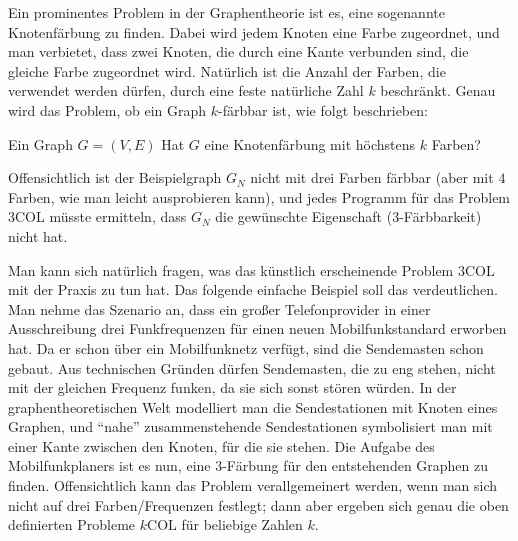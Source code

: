 Ein prominentes Problem in der Graphentheorie ist es, eine sogenannte
Knotenfärbung zu finden. Dabei wird jedem Knoten eine Farbe
zugeordnet, und man verbietet, dass zwei Knoten, die durch eine Kante
verbunden sind, die gleiche Farbe zugeordnet wird. Natürlich ist die
Anzahl der Farben, die verwendet werden dürfen, durch eine feste
natürliche Zahl $k$ beschränkt. Genau wird das Problem, ob ein Graph
$k$-färbbar ist, wie folgt beschrieben:

{Ein Graph $G=(V,E)$}
{Hat $G$ eine Knotenfärbung mit höchstens $k$ Farben?}

Offensichtlich ist der Beispielgraph $G_N$ nicht mit drei Farben färbbar
(aber mit $4$ Farben, wie man leicht ausprobieren kann), und jedes
Programm für das Problem $3\mathrm{COL}$ müsste ermitteln, dass $G_N$ die
gewünschte Eigenschaft ($3$-Färbbarkeit) nicht hat.

Man kann sich natürlich fragen, was das künstlich erscheinende
Problem $3\mathrm{COL}$ mit der Praxis zu tun hat. Das folgende einfache
Beispiel soll das verdeutlichen. Man nehme das Szenario an, dass
ein großer Telefonprovider in einer Ausschreibung drei
Funkfrequenzen für einen neuen Mobilfunkstandard erworben hat. Da er
schon über ein Mobilfunknetz verfügt, sind die Sendemasten schon
gebaut. Aus technischen Gründen dürfen Sendemasten, die zu eng stehen,
nicht mit der gleichen Frequenz funken, da sie sich sonst stören
würden. In der graphentheoretischen Welt modelliert man die
Sendestationen mit Knoten eines Graphen, und "`nahe"' zusammenstehende
Sendestationen symbolisiert man mit einer Kante zwischen den Knoten,
für die sie stehen. Die Aufgabe des Mobilfunkplaners ist es nun, eine
$3$-Färbung für den entstehenden Graphen zu finden. Offensichtlich
kann das Problem verallgemeinert werden, wenn man sich nicht auf drei
Farben/Frequenzen festlegt; dann aber ergeben sich genau die oben
definierten Probleme $k\mathrm{COL}$ für beliebige Zahlen $k$.


